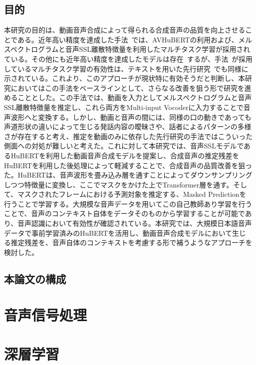 \documentclass[12pt]{jarticle}
\numberwithin{equation}{section}    %
\numberwithin{figure}{section}      %
\numberwithin{table}{section}      %
\begin{document}
\subsection{目的}
本研究の目的は、動画音声合成によって得られる合成音声の品質を向上させることである。近年高い精度を達成した手法~\cite{choi2023intelligible}では、AVHuBERTの利用および、メルスペクトログラムと音声SSL離散特徴量を利用したマルチタスク学習が採用されている。その他にも近年高い精度を達成したモデルは存在~\cite{hsu2023revise,sahipjohn2023robustl2s,kim2024let}するが、手法~\cite{choi2023intelligible}が採用しているマルチタスク学習の有効性は、テキストを用いた先行研究~\cite{kim2023lip_multitask}でも同様に示されている。これより、このアプローチが現状特に有効そうだと判断し、本研究においてはこの手法をベースラインとして、さらなる改善を狙う形で研究を進めることとした。この手法では、動画を入力としてメルスペクトログラムと音声SSL離散特徴量を推定し、これら両方をMulti-input Vocoderに入力することで音声波形へと変換する。しかし、動画と音声の間には、同様の口の動きであっても声道形状の違いによって生じる発話内容の曖昧さや、話者によるパターンの多様さが存在すると考え、推定を動画のみに依存した先行研究の手法ではこういった側面への対処が難しいと考えた。これに対して本研究では、音声SSLモデルであるHuBERTを利用した動画音声合成モデルを提案し、合成音声の推定残差をHuBERTを利用した後処理によって軽減することで、合成音声の品質改善を狙った。HuBERTは、音声波形を畳み込み層を通すことによってダウンサンプリングしつつ特徴量に変換し、ここでマスクをかけた上でTransformer層を通す。そして、マスクされたフレームにおける予測対象を推定する、Masked Predictionを行うことで学習する。大規模な音声データを用いてこの自己教師あり学習を行うことで、音声のコンテキスト自体をデータそのものから学習することが可能であり、音声認識において有効性が確認されている。本研究では、大規模日本語音声データで事前学習済みのHuBERTを活用し、動画音声合成モデルにおいて生じる推定残差を、音声自体のコンテキストを考慮する形で補うようなアプローチを検討した。

\subsection{本論文の構成}
\clearpage

\section{音声信号処理}
\clearpage

\section{深層学習}
\clearpage
\end{document}
